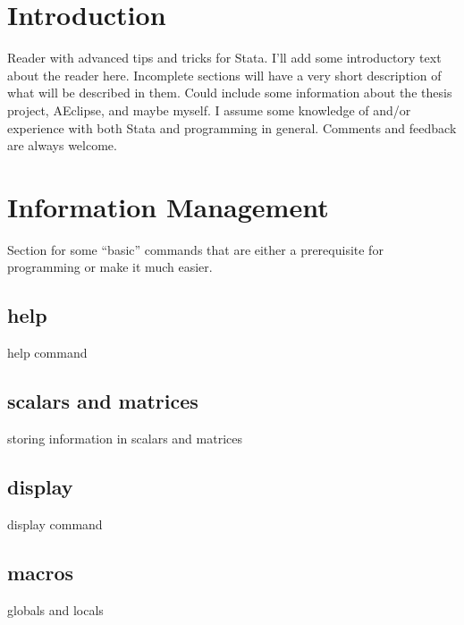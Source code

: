 \documentclass[12pt, a4paper]{article}
\begin{document}


\tableofcontents
{}

\newcommand{\sectionbreak}{%
  \par%
  \begin{center}---\texttt{*}---\end{center}%
  \clearpage%
}%

\section{Introduction}

Reader with advanced tips and tricks for Stata.
I'll add some introductory text about the reader here.
Incomplete sections will have a very short description of what will be described in them.
Could include some information about the thesis project, AEclipse, and maybe myself.
I assume some knowledge of and/or experience with both Stata and programming in general.
Comments and feedback are always welcome.

\section{Information Management}

Section for some ``basic'' commands that are either a prerequisite for programming or make it much easier.

\subsection{help}

help command

\subsection{scalars and matrices}

storing information in scalars and matrices

\subsection{display}

display command

\subsection{macros}

globals and locals
\end{document}
